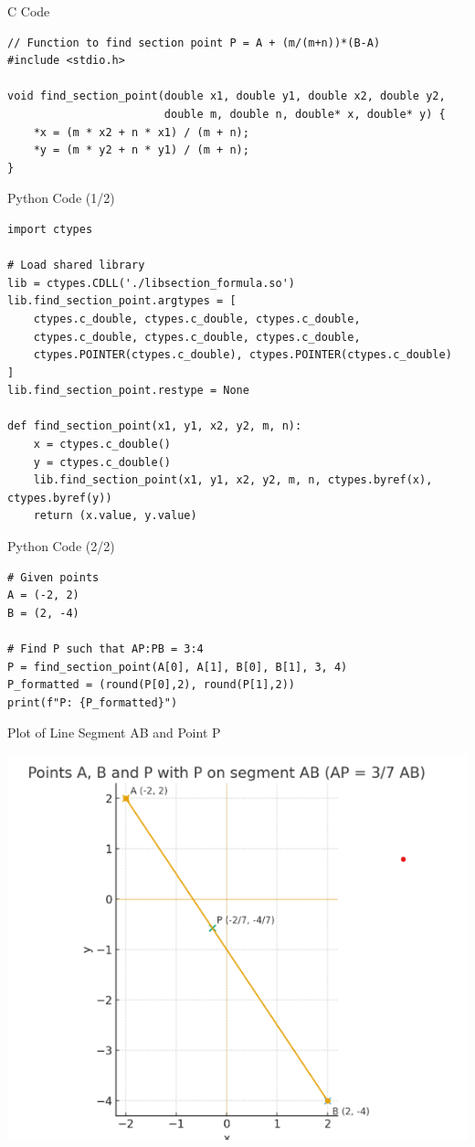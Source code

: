 \documentclass{beamer}
\begin{document}
\begin{frame}[fragile]{C Code}
\begin{verbatim}
// Function to find section point P = A + (m/(m+n))*(B-A)
#include <stdio.h>

void find_section_point(double x1, double y1, double x2, double y2, 
                        double m, double n, double* x, double* y) {
    *x = (m * x2 + n * x1) / (m + n);
    *y = (m * y2 + n * y1) / (m + n);
}
\end{verbatim}
\end{frame}

\begin{frame}[fragile]{Python Code (1/2)}
\begin{verbatim}
import ctypes

# Load shared library
lib = ctypes.CDLL('./libsection_formula.so')
lib.find_section_point.argtypes = [
    ctypes.c_double, ctypes.c_double, ctypes.c_double,
    ctypes.c_double, ctypes.c_double, ctypes.c_double,
    ctypes.POINTER(ctypes.c_double), ctypes.POINTER(ctypes.c_double)
]
lib.find_section_point.restype = None

def find_section_point(x1, y1, x2, y2, m, n):
    x = ctypes.c_double()
    y = ctypes.c_double()
    lib.find_section_point(x1, y1, x2, y2, m, n, ctypes.byref(x), ctypes.byref(y))
    return (x.value, y.value)
\end{verbatim}
\end{frame}

\begin{frame}[fragile]{Python Code (2/2)}
\begin{verbatim}
# Given points
A = (-2, 2)
B = (2, -4)

# Find P such that AP:PB = 3:4
P = find_section_point(A[0], A[1], B[0], B[1], 3, 4)
P_formatted = (round(P[0],2), round(P[1],2))
print(f"P: {P_formatted}")
\end{verbatim}
\end{frame}

\begin{frame}{Plot of Line Segment AB and Point P}
\begin{center}
\includegraphics[width=0.6\columnwidth]{figs/plot1.png}
\end{center}
\end{frame}
\end{document}
